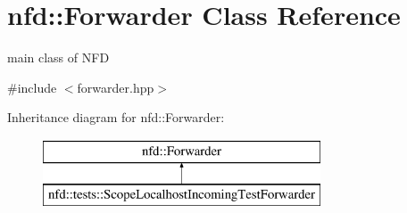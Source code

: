 \hypertarget{classnfd_1_1Forwarder}{}\section{nfd\+:\+:Forwarder Class Reference}
\label{classnfd_1_1Forwarder}


main class of N\+FD  




{\ttfamily \#include $<$forwarder.\+hpp$>$}

Inheritance diagram for nfd\+:\+:Forwarder\+:\begin{figure}[H]
\begin{center}
\leavevmode
\includegraphics[height=2.000000cm]{classnfd_1_1Forwarder}
\end{center}
\end{figure}
